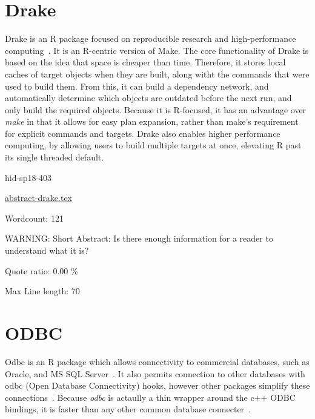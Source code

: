 \section{Drake}

Drake is an R package focused on reproducible research and
high-performance computing~\cite{hid-sp18-403-R-drake}. It is an
R-centric version of Make. The core functionality of Drake is based on
the idea that space is cheaper than time.  Therefore, it stores local
caches of target objects when they are built, along witht the commands
that were used to build them. From this, it can build a dependency
network, and automatically determine which objects are outdated before
the next run, and only build the required objects. Because it is
R-focused, it has an advantage over \textit{make} in that it allows
for easy plan expansion, rather than make's requirement for explicit
commands and targets.  Drake also enables higher performance
computing, by allowing users to build multiple targets at once,
elevating R past its single threaded default.


\begin{IU}

hid-sp18-403

\href{https://github.com/cloudmesh-community/hid-sp18-403/blob/master//technology/abstract-drake.tex}{abstract-drake.tex}

 

Wordcount: 121

WARNING: Short Abstract: Is there enough information for a reader to understand what it is?


Quote ratio: 0.00 \%
 
Max Line length: 70
\end{IU}

\section{ODBC}

Odbc is an R package which allows connectivity to commercial
databases, such as Oracle, and MS SQL
Server~\cite{hid-sp18-403-R-odbc}. It also permits connection to other
databases with odbc  (Open Database Connectivity) hooks, however other
packages simplify these connections~\cite{hid-sp18-403-R-dbi}.
Because \textit{odbc} is actaully a thin wrapper around the c++ ODBC
bindings, it is faster than any other common database
connecter~\cite{hid-sp18-403-rstudio-odbc}.


